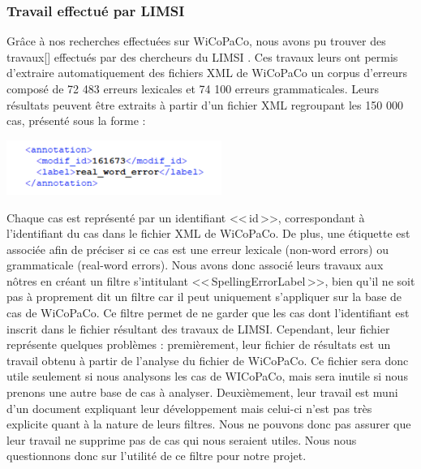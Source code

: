 \documentclass[11pt]{article}
\begin{document}
\subsubsection{Travail effectu\'{e} par LIMSI}

Gr\^{a}ce \`{a} nos recherches effectu\'{e}es sur WiCoPaCo, nous avons pu trouver des travaux[\cite[1]{1}] effectu\'{e}s par des chercheurs du LIMSI \autocite[4]{https://www.limsi.fr/fr/}. Ces travaux leurs ont permis d'extraire automatiquement des fichiers XML de WiCoPaCo un corpus d'erreurs compos\'{e} de 72 483 erreurs lexicales et 74 100 erreurs grammaticales. Leurs r\'{e}sultats peuvent \^{e}tre extraits 
\`{a} partir d'un fichier XML regroupant les 150 000 cas, pr\'{e}sent\'{e} sous la forme :

\begin{center}
\includegraphics[width=7cm]{exemple16.png} %
\end{center}

Chaque cas est repr\'{e}sent\'{e} par un identifiant <<\,id\,>>, correspondant \`{a} l'identifiant du cas dans le fichier XML de WiCoPaCo. De plus, une \'{e}tiquette est associ\'{e}e afin de pr\'{e}ciser si ce cas est une erreur lexicale (non-word errors) ou grammaticale (real-word errors). Nous avons donc associ\'{e} leurs travaux aux n\^{o}tres en cr\'{e}ant un filtre s'intitulant <<\,SpellingErrorLabel\,>>, bien qu'il ne soit pas \`{a} proprement dit un filtre car il peut uniquement s'appliquer sur la base de cas de WiCoPaCo. Ce filtre permet de ne garder que les cas dont l'identifiant est inscrit dans le fichier r\'{e}sultant des travaux de LIMSI.
\newline
\newline
Cependant, leur fichier repr\'{e}sente quelques probl\`{e}mes : premi\`{e}rement, leur fichier de r\'{e}sultats est un travail obtenu \`{a} partir de l'analyse du fichier de WiCoPaCo. Ce fichier sera donc utile seulement si nous analysons les cas de WICoPaCo, mais sera inutile si nous prenons une autre base de cas \`{a} analyser. Deuxi\`{e}mement, leur travail est muni d'un document expliquant leur d\'{e}veloppement mais celui-ci n'est pas tr\`{e}s explicite quant \`{a} la nature de leurs filtres. Nous ne pouvons donc pas assurer que leur travail ne supprime pas de cas qui nous seraient utiles. Nous nous questionnons donc sur l'utilit\'{e} de ce filtre pour notre projet.
\newline
\newline
\end{document}
